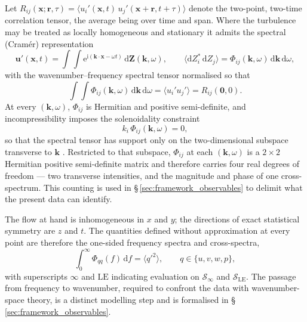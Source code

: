 \documentclass[lineno]{JFM-FLM_Au}
\begin{document}
Let
$R_{ij}(\boldsymbol{x};\boldsymbol{r},\tau)
= \langle u_i'(\boldsymbol{x},t)\,
          u_j'(\boldsymbol{x}+\boldsymbol{r},t+\tau)\rangle$
denote the two-point, two-time correlation tensor, the average being over
time and span. Where the turbulence may be treated as locally homogeneous
and stationary it admits the spectral (Cram\'er) representation
\begin{equation}
  \boldsymbol{u}'(\boldsymbol{x},t)
  = \int\!\!\int
    \mathrm{e}^{\mathrm{i}(\boldsymbol{k}\cdot\boldsymbol{x} - \omega t)}\,
    \mathrm{d}\boldsymbol{Z}(\boldsymbol{k},\omega),
  \qquad
  \big\langle \mathrm{d}Z_i^{*}\,\mathrm{d}Z_j \big\rangle
  = \Phi_{ij}(\boldsymbol{k},\omega)\,
    \mathrm{d}\boldsymbol{k}\,\mathrm{d}\omega,
  \label{eq:cramer}
\end{equation}
with the wavenumber--frequency spectral tensor normalised so that
\begin{equation}
  \int\!\!\int \Phi_{ij}(\boldsymbol{k},\omega)\,
  \mathrm{d}\boldsymbol{k}\,\mathrm{d}\omega
  = \big\langle u_i' u_j' \big\rangle
  = R_{ij}(\boldsymbol{0},0).
  \label{eq:spectraltensor}
\end{equation}
At every $(\boldsymbol{k},\omega)$, $\Phi_{ij}$ is Hermitian and positive
semi-definite, and incompressibility imposes the solenoidality constraint
\begin{equation}
  k_i\,\Phi_{ij}(\boldsymbol{k},\omega) = 0,
  \label{eq:solenoidal}
\end{equation}
so that the spectral tensor has support only on the two-dimensional
subspace transverse to $\boldsymbol{k}$
\citep{Batchelor1953,Pope2000}. Restricted to that subspace,
$\Phi_{ij}$ at each $(\boldsymbol{k},\omega)$ is a $2\times2$ Hermitian
positive semi-definite matrix and therefore carries four real degrees of
freedom --- two transverse intensities, and the magnitude and phase of one
cross-spectrum. This counting is used in
\S\,\ref{sec:framework_observables} to delimit what the present data can
identify.

The flow at hand is inhomogeneous in $x$ and $y$; the directions of exact
statistical symmetry are $z$ and $t$. The quantities defined without
approximation at every point are therefore the one-sided frequency spectra
and cross-spectra,
\begin{equation}
  \int_0^\infty \Phi_{qq}(f)\,\mathrm{d}f = \big\langle q'^2 \big\rangle,
  \qquad q \in \{u,v,w,p\},
  \label{eq:freqspec}
\end{equation}
with superscripts $\infty$ and $\mathrm{LE}$ indicating evaluation on
$\mathcal{S}_\infty$ and $\mathcal{S}_{\mathrm{LE}}$. The passage from
frequency to wavenumber, required to confront the data with
wavenumber-space theory, is a distinct modelling step and is formalised in
\S\,\ref{sec:framework_observables}.
\end{document}
